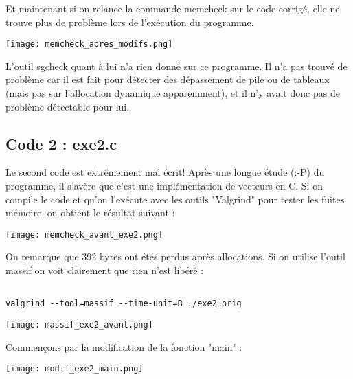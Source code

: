 Et maintenant si on relance la commande memcheck sur le code corrigé, elle ne trouve plus de problème lors de l'exécution du programme.
\begin{center} 
\hspace{15cm}
\texttt{[image: memcheck\_apres\_modifs.png]}
\end{center}
\vspace{0.5cm}

L'outil sgcheck quant à lui n'a rien donné sur ce programme. Il n'a pas trouvé de problème car il est fait pour détecter des dépassement de pile ou de tableaux (mais pas sur l'allocation dynamique apparemment), et il n'y avait donc pas de problème détectable pour lui.\\

\pagebreak
\subsection{Code 2 : exe2.c}
Le second code est extrêmement mal écrit! Après une longue étude (:-P) du programme, il s'avère que c'est une implémentation de vecteurs en C. Si on compile le code et qu'on l'exécute avec les outils "Valgrind" pour tester les fuites mémoire, on obtient le résultat suivant :
\begin{center} 
\hspace{15cm}
\texttt{[image: memcheck\_avant\_exe2.png]}
\end{center}
\vspace{0.5cm}

On remarque que 392 bytes ont étés perdus après allocations. Si on utilise l'outil massif on voit clairement que rien n'est libéré :
\begin{lstlisting}[frame=single,style=Console]  % Start your code-block

valgrind --tool=massif --time-unit=B ./exe2_orig
\end{lstlisting}
\begin{center} 
\hspace{15cm}
\texttt{[image: massif\_exe2\_avant.png]}
\end{center}
\vspace{0.5cm}
\pagebreak





Commençons par la modification de la fonction "main" :
\begin{center} 
\hspace{15cm}
\texttt{[image: modif\_exe2\_main.png]}
\end{center}
\vspace{0.5cm}

